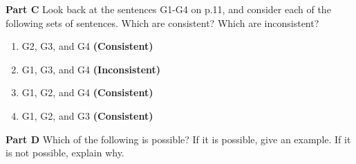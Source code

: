 \documentclass[12pt, letterpaper, twoside]{article}
\begin{document}
\noindent \textbf{Part C} Look back at the sentences G1-G4
on p.11, and consider each of the following sets of
sentences. Which are consistent? Which are inconsistent?

\begin{enumerate}
    \item G2, G3, and G4 \textbf{(Consistent)}
    \item G1, G3, and G4 \textbf{(Inconsistent)}
    \item G1, G2, and G4 \textbf{(Consistent)}
    \item G1, G2, and G3 \textbf{(Consistent)}
\end{enumerate}

\noindent \textbf{Part D} Which of the following is
possible? If it is possible, give an example. If it is not
possible, explain why.
\end{document}
